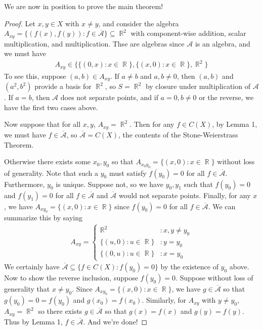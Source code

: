 \documentclass[11pt, a4paper]{memoir}
\DeclareMathOperator{\R}{{\mathbb{R}}}
\theoremstyle{change}
\theoremstyle{plain}
\theoremstyle{nonumberplain}
\newtheorem{proof}{Proof}
\numberwithin{equation}{section}
\begin{document}
We are now in position to prove the main theorem!
\begin{proof}
    Let $x,y\in X$ with $x\neq y$, and consider the algebra $A_{xy}=\{(f(x),f(y)):f\in \overline{\mathcal{A}}\}\subseteq\R^2$ with component-wise addition, scalar multiplication, and multiplication.
    Thse are algebras since $\mathcal{A}$ is an algebra, and we must have
    \begin{align*}
        A_{xy}\in\{\{(0,x):x\in\R\},\{(x,0):x\in\R\},{\R}^2\}
    \end{align*}
    To see this, suppose $(a,b)\in A_{xy}$.
    If $a\neq b$ and $a,b\neq 0$, then $(a,b)$ and $(a^2,b^2)$ provide a basis for $\R^2$, so $S=\R^2$ by closure under multiplication of $\mathcal{A}$.
    If $a=b$, then $\mathcal{A}$ does not separate points, and if $a=0,b\neq 0$ or the reverse, we have the first two cases above.

    Now suppose that for all $x,y$, $A_{xy}=\R^2$.
    Then for any $f\in C(X)$, by Lemma 1, we must have $f\in\overline{\mathcal{A}}$, so $\overline{\mathcal{A}}=C(X)$, the contents of the Stone-Weierstrass Theorem.

    Otherwise there exists some $x_0,y_0$ so that $A_{x_0y_0}=\{(x,0):x\in\R\}$ without loss of generality.
    Note that such a $y_0$ must satisfy $f(y_0)=0$ for all $f\in\overline{\mathcal{A}}$.
    Furthermore, $y_0$ is unique.
    Suppose not, so we have $y_0,y_1$ such that $f(y_0)=0$ and $f(y_1)=0$ for all $f\in\mathcal{\overline{A}}$ and $\mathcal{\overline{A}}$ would not separate points.
    Finally, for any $x$, we have $A_{xy_0}=\{(x,0):x\in\R\}$ since $f(y_0)=0$ for all $f\in\overline{\mathcal{A}}$.
    We can summarize this by saying
    \begin{align*}
        A_{xy}=\begin{cases}
            {\R}^2 &: x,y\neq y_0\\
            \{(u,0):u\in\R\} &: y=y_0\\
            \{(0,u):u\in\R\} &: x=y_0
        \end{cases}
    \end{align*}
    We certainly have $\overline{\mathcal{A}}\subseteq\{f\in C(X):f(y_0)=0\}$ by the existence of $y_0$ above.
    Now to show the reverse inclusion, suppose $f(y_0)=0$.
    Suppose without loss of generality that $x\neq y_0$.
    Since $A_{xy_0}=\{(x,0):x\in\R\}$, we have $g\in\overline{\mathcal{A}}$ so that $g(y_0)=0=f(y_0)$ and $g(x_0)=f(x_0)$.
    Similarly, for $A_{xy}$ with $y\neq y_0$, $A_{xy}=\R^2$ so there exists $g\in\overline{\mathcal{A}}$ so that $g(x)=f(x)$ and $g(y)=f(y)$.
    Thus by Lemma 1, $f\in\overline{\mathcal{A}}$.
    And we're done!
\end{proof}
\end{document}

